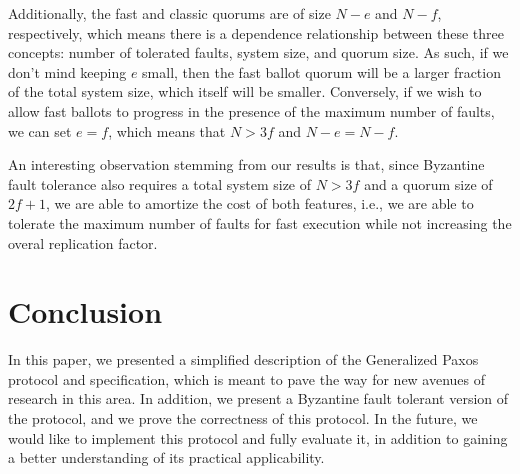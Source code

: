 Additionally, the fast and classic quorums are of size $N-e$ and $N-f$, respectively, which means there is a dependence relationship between these three concepts: number of tolerated faults, system size, and quorum size. As such, if we don't mind keeping $e$ small, then the fast ballot quorum will be a larger fraction of the total system size, which itself will be smaller. Conversely, if we wish to allow fast ballots to progress in the presence of the maximum number of faults, we can set $e=f$, which means that $N >3f$ and $N-e=N-f$. 


An interesting observation stemming from our results is that, since Byzantine fault tolerance also requires a total system size of $N>3f$ and a quorum size of $2f+1$, we are able to amortize the cost of both features, i.e., we are able to tolerate the maximum number of faults for fast execution while not increasing the overal replication factor.



\section{Conclusion}
\label{sec:conc}
In this paper, we presented a simplified description of the Generalized Paxos protocol and specification, which is meant to pave the way for new avenues of research in this area. In addition, we present a Byzantine fault tolerant version of the protocol, and we prove the correctness of this protocol. In the future, we would like to implement this protocol and fully evaluate it, in addition to gaining a better understanding of its practical applicability.
